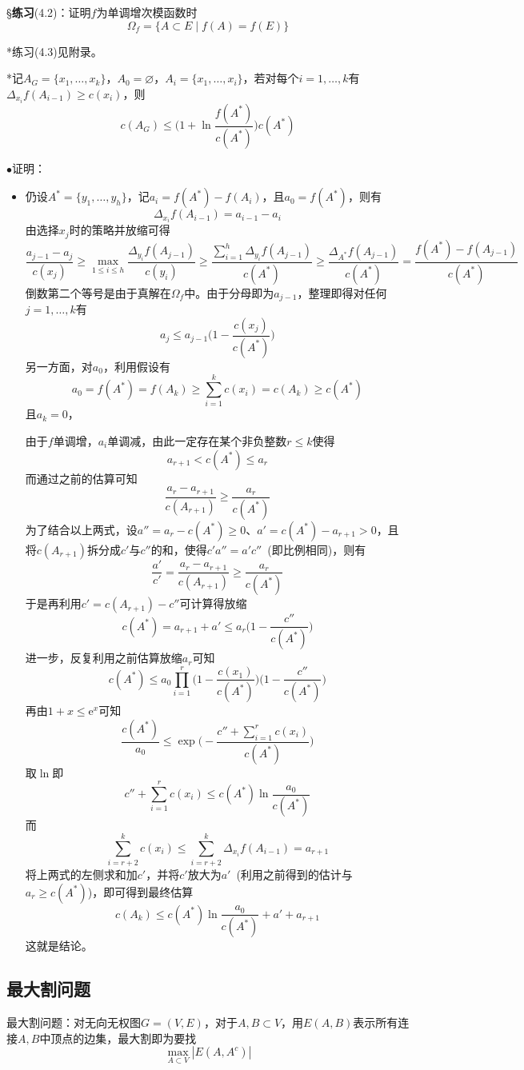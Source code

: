 \documentclass[a4paper,UTF8,fontset=windows]{ctexart}
\newcommand{\exce}[2]{\S\textbf{练习}(#1)：{\kaishu #2}}
\newcommand{\proo}[1]{{\kaishu $\bullet$证明：
\begin{itemize}
    \item[] #1
\end{itemize}
}}
\newcommand{\er}{\mathrm{e}}
\begin{document}
\exce{4.2}{证明$f$为单调增次模函数时
$$\Omega_f=\{A\subset E\mid f(A)=f(E)\}$$}

*练习(4.3)见附录。

*记$A_G=\{x_1,\dots,x_k\}$，$A_0=\varnothing$，$A_i=\{x_1,\dots,x_i\}$，若对每个$i=1,\dots,k$有$\Delta_{x_i}f(A_{i-1})\ge c(x_i)$，则
$$c(A_G)\le\bigg(1+\ln\frac{f(A^*)}{c(A^*)}\bigg)c(A^*)$$

\proo{
    仍设$A^*=\{y_1,\dots,y_h\}$，记$a_i=f(A^*)-f(A_i)$，且$a_0=f(A^*)$，则有
    $$\Delta_{x_i}f(A_{i-1})=a_{i-1}-a_i$$
    由选择$x_j$时的策略并放缩可得
    $$\frac{a_{j-1}-a_j}{c(x_j)}\ge\max_{1\le i\le h}\frac{\Delta_{y_i}f(A_{j-1})}{c(y_i)}\ge\frac{\sum_{i=1}^h\Delta_{y_i}f(A_{j-1})}{c(A^*)}\ge\frac{\Delta_{A^*}f(A_{j-1})}{c(A^*)}=\frac{f(A^*)-f(A_{j-1})}{c(A^*)}$$
    倒数第二个等号是由于真解在$\Omega_f$中。由于分母即为$a_{j-1}$，整理即得对任何$j=1,\dots,k$有
    $$a_j\le a_{j-1}\bigg(1-\frac{c(x_j)}{c(A^*)}\bigg)$$
    另一方面，对$a_0$，利用假设有
    $$a_0=f(A^*)=f(A_k)\ge\sum_{i=1}^kc(x_i)=c(A_k)\ge c(A^*)$$
    且$a_k=0$，

    由于$f$单调增，$a_i$单调减，由此一定存在某个非负整数$r\le k$使得
    $$a_{r+1}<c(A^*)\le a_r$$
    而通过之前的估算可知
    $$\frac{a_r-a_{r+1}}{c(A_{r+1})}\ge\frac{a_r}{c(A^*)}$$
    为了结合以上两式，设$a''=a_r-c(A^*)\ge0$、$a'=c(A^*)-a_{r+1}>0$，且将$c(A_{r+1})$拆分成$c'$与$c''$的和，使得$c'a''=a'c''$\ (即比例相同)，则有
    $$\frac{a'}{c'}=\frac{a_r-a_{r+1}}{c(A_{r+1})}\ge\frac{a_r}{c(A^*)}$$
    于是再利用$c'=c(A_{r+1})-c''$可计算得放缩
    $$c(A^*)=a_{r+1}+a'\le a_r\bigg(1-\frac{c''}{c(A^*)}\bigg)$$
    进一步，反复利用之前估算放缩$a_r$可知
    $$c(A^*)\le a_0\prod_{i=1}^r\bigg(1-\frac{c(x_1)}{c(A^*)}\bigg)\bigg(1-\frac{c''}{c(A^*)}\bigg)$$
    再由$1+x\le\er^x$可知
    $$\frac{c(A^*)}{a_0}\le\exp\bigg(-\frac{c''+\sum_{i=1}^rc(x_i)}{c(A^*)}\bigg)$$
    取$\ln$即
    $$c''+\sum_{i=1}^rc(x_i)\le c(A^*)\ln\frac{a_0}{c(A^*)}$$
    而
    $$\sum_{i=r+2}^kc(x_i)\le\sum_{i=r+2}^k\Delta_{x_i}f(A_{i-1})=a_{r+1}$$
    将上两式的左侧求和加$c'$，并将$c'$放大为$a'$\ (利用之前得到的估计与$a_r\ge c(A^*)$)，即可得到最终估算
    $$c(A_k)\le c(A^*)\ln\frac{a_0}{c(A^*)}+a'+a_{r+1}$$
    这就是结论。

}

\subsection{最大割问题}
最大割问题：对无向无权图$G=(V,E)$，对于$A,B\subset V$，用$E(A,B)$表示所有连接$A,B$中顶点的边集，最大割即为要找
$$\max_{A\subset V}|E(A,A^c)|$$
\end{document}
